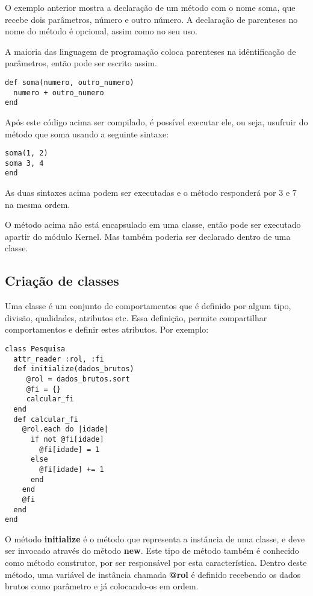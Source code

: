 \documentclass[espaco=simples,appendix=Name]{abnt}
\newcommand{\code}[1] {\textbf{#1}}
\begin{document}
O exemplo anterior mostra a declaração de um método com o nome soma, que recebe dois parâmetros, número e outro número. A declaração de parenteses no nome do método é opcional, assim como no seu uso. 

A maioria das linguagem de programação coloca parenteses na idêntificação de parâmetros, então pode ser escrito assim.

\begin{lstlisting}[caption=implementando um método de soma usando parenteses alternativo]
def soma(numero, outro_numero)
  numero + outro_numero
end
\end{lstlisting}

Após este código acima ser compilado, é possível executar ele, ou seja, usufruir do método que soma usando a seguinte sintaxe:

\begin{lstlisting}[caption=usufruindo do método de soma]
soma(1, 2)
soma 3, 4
end
\end{lstlisting}

As duas sintaxes acima podem ser executadas e o método responderá por 3 e 7 na mesma ordem.

O método acima não está encapsulado em uma classe, então pode ser executado apartir do módulo Kernel. Mas também poderia ser declarado dentro de uma classe.

\subsection{Criação de classes}

Uma classe é um conjunto de comportamentos que é definido por algum tipo, divisão, qualidades, atributos etc. Essa definição, permite compartilhar comportamentos e definir estes atributos. Por exemplo:

\begin{lstlisting}[caption=Criando uma classe, label=classePesquisa]
class Pesquisa
  attr_reader :rol, :fi
  def initialize(dados_brutos)
     @rol = dados_brutos.sort
     @fi = {}
     calcular_fi
  end
  def calcular_fi
    @rol.each do |idade|
      if not @fi[idade]
        @fi[idade] = 1
      else
        @fi[idade] += 1
      end
    end
    @fi
  end
end
\end{lstlisting}

O método \code{initialize} é o método que representa a instância de uma classe, e deve ser invocado através do método \code{new}. Este tipo de método também é conhecido como método construtor, por ser responsável por esta característica. Dentro deste método, uma variável de instância chamada \code{@rol} é definido recebendo os dados brutos como parâmetro e já colocando-os em ordem.
\end{document}
